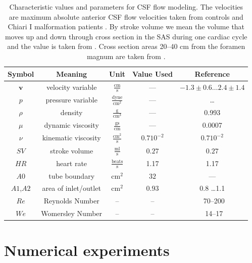 \begin{table}
  \centering
  \begin{tabular}{ | c | c | c | c | c | }
    \hline
    Symbol & Meaning & Unit & Value Used & Reference \\ \hline\hline
    $\mathbf{v}$	& velocity variable & $\mathrm{ \frac{cm}{s}}$ & --- & $-1.3\pm 0.6 \ldots 2.4 \pm 1.4$  \\
    $p$		& pressure	variable & $\mathrm{\frac{dyne}{cm^2}}$ & --- & \ldots\\
    $\rho$	& density & $\mathrm{\frac{g}{cm^3}}$ & --- &0.993 \\ %
    $\mu$	& dynamic viscosity	&  $\mathrm{\frac{g s}{cm}}$ & --- & 0.0007\\
    $\nu$	& kinematic viscosity & $\mathrm{ \frac{cm^2}{s}}$ & $0.7 10^{-2}$ & $0.7 10^{-2}$ \\ 	\hline %
    $SV$	& stroke volume 	& $\mathrm{ \frac{ml}{s}}$& $0.27$  & $0.27$ \\
    $HR$	& heart rate & $\mathrm{\frac{beats}{s}}$	& 1.17 & 1.17\\
    $A0$	& tube boundary	& $\mathrm{ cm^2}$ & $32$  & ---\\
    $A1$,$A2$	& area of inlet/outlet & $\mathrm{ cm^2}$ &$0.93$ & 0.8 \ldots 1.1   \\
    \hline
    $Re$    & Reynolds Number & -- & -- & ~70--200 \\
    $We$    & Womersley Number & -- & -- & ~14--17 \\
    \hline
  \end{tabular}
  \caption{Characteristic values and parameters for CSF flow
    modeling.  The velocities are maximum absolute anterior CSF flow
    velocities taken from controls and Chiari I malformation patients
    \citep{HofmannWarmuth-MetzBendszusEtAl2000}.  By stroke volume
    we mean the volume that moves up and down through cross section
    in the SAS during one cardiac cycle and the value is taken from
    \citep{GuptaSoellingerBoesigerEtAl2009}.  Cross section areas 20--40 cm
    from the foramen magnum are taken from \citep{LothYardimciAlperin2001}.}
  \label{tab:entities}
\end{table}

\section{Numerical experiments}

